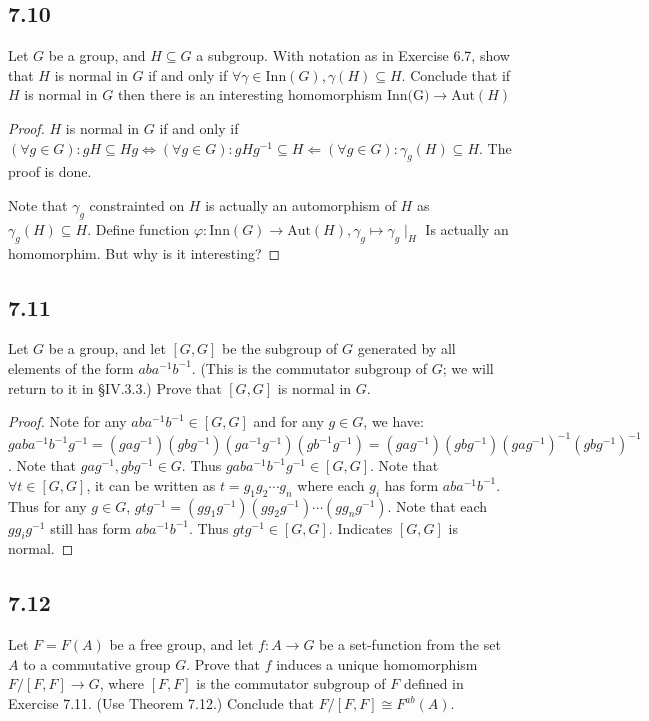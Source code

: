 \documentclass[a4paper, pdf, 12pt]{article}
\begin{document}
\subsection*{7.10}
Let $G$ be a group, and $H \subseteq G$ a subgroup. With notation as in Exercise 6.7,
show that $H$ is normal in $G$ if and only if $\forall \gamma \in \mbox{Inn}(G), \gamma(H) \subseteq H$.
Conclude that if $H$ is normal in $G$ then there is an interesting homomorphism
$\mbox{Inn(G)} \longrightarrow \mbox{Aut}(H)$

\begin{proof}
  $H$ is normal in $G$ if and only if $(\forall g\in G):gH\subseteq Hg\Longleftrightarrow (\forall g\in G):gHg^{-1}\subseteq H
  \Longleftarrow (\forall g\in G):\gamma_{g}(H)\subseteq H $. The proof is done.

  Note that $\gamma_{g}$ constrainted on $H$ is actually an automorphism of $H$ as $\gamma_{g}(H)\subseteq H$.
  Define function $\varphi: \mbox{Inn}(G)\longrightarrow \mbox{Aut}(H), \gamma_{g}\mapsto \gamma_{g}\mid_{H}$ Is 
  actually an homomorphim. But why is it interesting?
\end{proof}

\subsection*{7.11}
Let $G$ be a group, and let $[G, G]$ be the subgroup of $G$ generated by all
elements of the form $aba^{-1}b^{-1}$. (This is the commutator subgroup of $G$; we will
return to it in §IV.3.3.) Prove that $[G, G]$ is normal in $G$.

\begin{proof}
  Note for any $aba^{-1}b^{-1}\in [G,G]$ and for any $g\in G$, we have:
  $gaba^{-1}b^{-1}g^{-1} = (gag^{-1})(gbg^{-1})(ga^{-1}g^{-1})(gb^{-1}g^{-1}) = (gag^{-1})(gbg^{-1})(gag^{-1})^{-1}(gbg^{-1})^{-1}$.
  Note that $gag^{-1}, gbg^{-1}\in G$. Thus $gaba^{-1}b^{-1}g^{-1} \in [G,G]$. Note that 
  $\forall t\in [G, G]$, it can be written as $t = g_1g_2\cdots g_{n}$ where 
  each $g_i$ has form $aba^{-1}b^{-1}$. Thus for any $g\in G$, $gtg^{-1} = (gg_1g^{-1})(gg_2g^{-1})\cdots (gg_{n}g^{-1})$. 
  Note that each $gg_{i}g^{-1}$ still has form $aba^{-1}b^{-1}$. Thus $gtg^{-1}\in [G, G]$. Indicates $[G, G]$ is normal.
\end{proof}

\subsection*{7.12}
Let $F = F(A)$ be a free group, and let $f: A \longrightarrow G$ be a set-function
from the set $A$ to a commutative group $G$. Prove that $f$ induces a unique homomorphism $F/[F, F] \rightarrow G$, where $[F, F]$ is the 
commutator subgroup of $F$ defined
in Exercise 7.11. (Use Theorem 7.12.) Conclude that $F/[F, F] \cong F^{ab}(A)$.
\end{document}
